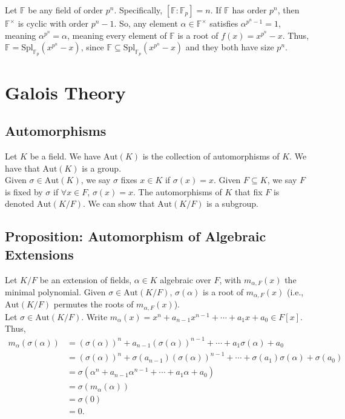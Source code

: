 \documentclass[10pt]{extarticle}
\begin{document}
  Let $\mathbb{F}$ be any field of order $p^n$. Specifically, $[\mathbb{F}:\mathbb{F}_p] = n$. If $\mathbb{F}$ has order $p^n$, then $\mathbb{F}^{\times}$ is cyclic with order $p^n - 1$. So, any element $\alpha \in \mathbb{F}^{\times}$ satisfies $\alpha^{p^n - 1} = 1$, meaning $\alpha^{p^n} = \alpha$, meaning every element of $\mathbb{F}$ is a root of $f(x) = x^{p^n} - x$. Thus, $\mathbb{F} = \text{Spl}_{\mathbb{F}_p}\left(x^{p^n} - x\right)$, since $\mathbb{F}\subseteq \text{Spl}_{\mathbb{F}_p}\left(x^{p^n} - x\right)$ and they both have size $p^n$.
  \section{Galois Theory}%
  \subsection{Automorphisms}%
  Let $K$ be a field. We have $\text{Aut}(K)$ is the collection of automorphisms of $K$. We have that $\text{Aut}(K)$ is a group.\\

  Given $\sigma\in \text{Aut}(K)$, we say $\sigma$ fixes $x\in K$ if $\sigma(x) = x$. Given $F\subseteq K$, we say $F$ is fixed by $\sigma$ if $\forall x\in F$, $\sigma(x) = x$. The automorphisms of $K$ that fix $F$ is denoted $\text{Aut}(K/F)$. We can show that $\text{Aut}(K/F)$ is a subgroup.
  \subsection{Proposition: Automorphism of Algebraic Extensions}%
  Let $K/F$ be an extension of fields, $\alpha\in K$ algebraic over $F$, with $m_{\alpha,F}(x)$ the minimal polynomial. Given $\sigma \in \text{Aut}(K/F)$, $\sigma(\alpha)$ is a root of $m_{\alpha,F}(x)$ (i.e., $\text{Aut}(K/F)$ permutes the roots of $m_{\alpha,F}(x)$).\\

  Let $\sigma \in \text{Aut}(K/F)$. Write $m_{\alpha}(x) = x^{n} + a_{n-1}x^{n-1} + \cdots + a_1x + a_0\in F[x]$. Thus,
  \begin{align*}
    m_{\alpha}(\sigma(\alpha)) &= \left(\sigma(\alpha)\right)^n + a_{n-1}\left(\sigma(\alpha)\right)^{n-1} + \cdots + a_1\sigma(\alpha) + a_0\\
                               &= \left(\sigma(\alpha)\right)^{n} + \sigma(a_{n-1})\left(\sigma(\alpha)\right)^{n-1} + \cdots + \sigma(a_1)\sigma(\alpha) + \sigma(a_0)\\
                               &= \sigma\left(\alpha^n + a_{n-1}\alpha^{n-1}+ \cdots + a_1\alpha + a_0\right)\\
                               &= \sigma(m_{\alpha}(\alpha))\\
                               &= \sigma(0)\\
                               &= 0.
  \end{align*}
\end{document}
